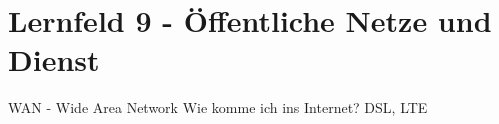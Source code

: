 \section{Lernfeld 9 - Öffentliche Netze und Dienst}

WAN - Wide Area Network
Wie komme ich ins Internet?
DSL, LTE

